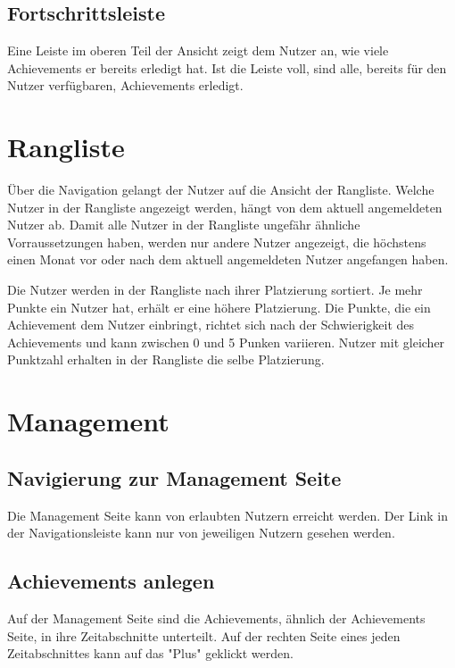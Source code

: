 \documentclass[11pt]{article}
\begin{document}

\subsection{Fortschrittsleiste}
Eine Leiste im oberen Teil der Ansicht zeigt dem Nutzer an, wie viele Achievements er bereits erledigt hat.
Ist die Leiste voll, sind alle, bereits für den Nutzer verfügbaren, Achievements erledigt. 


\section{Rangliste}
Über die Navigation gelangt der Nutzer auf die Ansicht der Rangliste. 
Welche Nutzer in der Rangliste angezeigt werden, hängt von dem aktuell angemeldeten Nutzer ab.
Damit alle Nutzer in der Rangliste ungefähr ähnliche Vorraussetzungen haben, werden nur andere Nutzer angezeigt,
die höchstens einen Monat vor oder nach dem aktuell angemeldeten Nutzer angefangen haben.

Die Nutzer werden in der Rangliste nach ihrer Platzierung sortiert. Je mehr Punkte ein Nutzer hat, erhält er eine höhere Platzierung.
Die Punkte, die ein Achievement dem Nutzer einbringt, richtet sich nach der Schwierigkeit des Achievements und kann zwischen 0 und 5 Punken variieren.
Nutzer mit gleicher Punktzahl erhalten in der Rangliste die selbe Platzierung.


\section{Management}
\subsection{Navigierung zur Management Seite}
Die Management Seite kann von erlaubten Nutzern erreicht werden. Der Link in der Navigationsleiste kann nur von jeweiligen
Nutzern gesehen werden.

\subsection{Achievements anlegen}
Auf der Management Seite sind die Achievements, ähnlich der Achievements Seite, in ihre Zeitabschnitte unterteilt.
Auf der rechten Seite eines jeden Zeitabschnittes kann auf das "Plus" geklickt werden.
\end{document}
